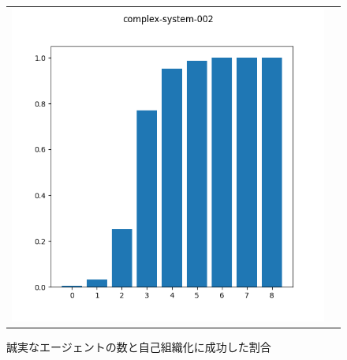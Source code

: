 \begin{figure}[h]
  \begin{tabular}{cc}
    \begin{minipage}[t]{1\hsize}
      \centering
      \includegraphics[keepaspectratio, width=1\linewidth]{./05_complex-system/complex-system-002.png}
      \caption{誠実なエージェントの数と自己組織化に成功した割合}
      \label{compex-system-002}
    \end{minipage}
  \end{tabular}
\end{figure}
